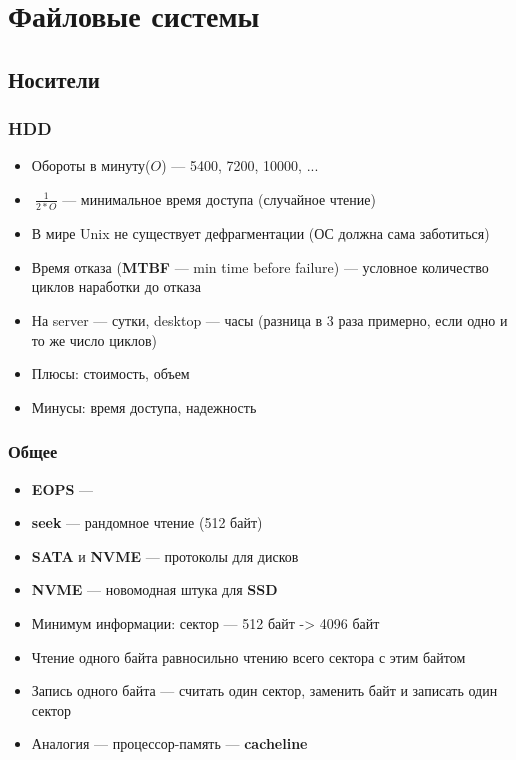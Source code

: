 \documentclass[../lectures.tex]{subfiles}
\begin{document}
\chapter{Файловые системы}

\section{Носители}
\subsection{HDD}
\begin{itemize}
    \item Обороты в минуту($O$) --- 5400, 7200, 10000, ...
    \item $~\frac{1}{2 * O}$ --- минимальное время доступа (случайное чтение)
    \item В мире Unix не существует дефрагментации (ОС должна сама заботиться)
    \item Время отказа (\textbf{MTBF} --- min time before failure) --- условное 
          количество циклов наработки до отказа
    \item На server --- сутки, desktop --- часы (разница в 3 раза примерно, 
          если одно и то же число циклов)
    \item Плюсы: стоимость, объем
    \item Минусы: время доступа, надежность
\end{itemize}

\subsection{Общее}
\begin{itemize}
    \item \textbf{EOPS} --- \todo{}
    \item \textbf{seek} --- рандомное чтение (512 байт)
    \item \textbf{SATA} и \textbf{NVME} --- протоколы для дисков
    \item \textbf{NVME} --- новомодная штука для \textbf{SSD}
    \item Минимум информации: сектор --- 512 байт -> 4096 байт
    \item Чтение одного байта равносильно чтению всего сектора с этим байтом
    \item Запись одного байта --- считать один сектор, заменить байт и записать один сектор
    \item Аналогия --- процессор-память --- \textbf{cacheline}
\end{itemize}
\end{document}
